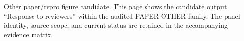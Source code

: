 Other paper/repro figure candidate. This page shows the candidate output ``Response to reviewers'' within the audited PAPER-OTHER family. The panel identity, source scope, and current status are retained in the accompanying evidence matrix.
